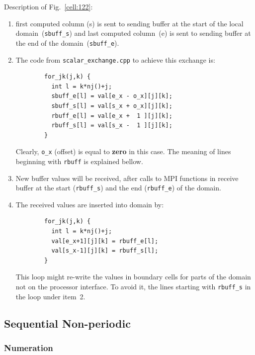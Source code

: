 Description of Fig.~\ref{cell:122}:
\begin{enumerate}
  \item first computed column ({\sf s}) is sent to sending buffer at the start
        of the local domain~({\tt sbuff\_s}) and last computed column~({\sf e}) 
        is sent to sending buffer at the end of the domain~({\tt sbuff\_e}).
  \item The code from {\tt scalar\_exchange.cpp} to achieve this exchange is:
        \begin{verbatim}
        for_jk(j,k) {
          int l = k*nj()+j;
          sbuff_e[l] = val[e_x - o_x][j][k];   
          sbuff_s[l] = val[s_x + o_x][j][k];  
          rbuff_e[l] = val[e_x +  1 ][j][k];
          rbuff_s[l] = val[s_x -  1 ][j][k];
        }
        \end{verbatim}
        Clearly, {\tt o\_x} (offset) is equal to {\bf zero} in this case. The meaning
        of lines beginning with {\tt rbuff} is explained bellow.
  \item New buffer values will be received, after calls to MPI functions in 
        receive buffer at the start ({\tt rbuff\_s}) and the end ({\tt rbuff\_e})
        of the domain.   
  \item The received values are inserted into domain by:
        \begin{verbatim}
        for_jk(j,k) {
          int l = k*nj()+j;
          val[e_x+1][j][k] = rbuff_e[l]; 
          val[s_x-1][j][k] = rbuff_s[l];
        }
        \end{verbatim}
        This loop might re-write the values in boundary cells for parts of the
        domain not on the processor interface. To avoid it, the lines starting
        with {\tt rbuff\_s} in the loop under item~2.
\end{enumerate}

\subsection{Sequential Non-periodic}

\subsubsection{Numeration}

